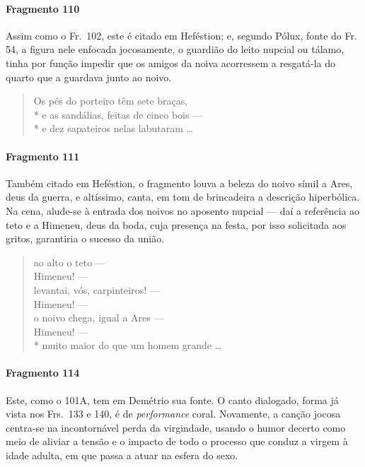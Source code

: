 {\paragraph{Fragmento 110}

{\small Assim como o Fr.~102, este é citado em Heféstion; e, segundo Pólux, fonte do Fr.
54, a figura nele enfocada jocosamente, o guardião do leito nupcial ou tálamo,
tinha por função impedir que os amigos da noiva acorressem a resgatá-la do
quarto que a guardava junto ao noivo.}

\begin{verse}
Os pés do porteiro têm sete braças,\\*
e as sandálias, feitas de cinco bois --- \\*
e dez sapateiros nelas labutaram \ldots{}
\end{verse}

\paragraph{Fragmento 111}

{\small Também citado em Heféstion, o fragmento louva a beleza do noivo símil a Ares,
deus da guerra, e altíssimo, canta, em tom de brincadeira a descrição
hiperbólica. Na cena, alude-se à entrada dos noivos no aposento nupcial --- daí a
referência ao teto e a Himeneu, deus da boda, cuja presença na festa, por isso
solicitada aos gritos, garantiria o sucesso da união.}

\begin{verse}
ao alto o teto --- \\
Himeneu! --- \\
levantai, vós, carpinteiros! --- \\
Himeneu! --- \\
o noivo chega, igual a Ares --- \\
Himeneu! --- \\*
muito maior do que um homem grande \ldots{}
\end{verse}

\paragraph{Fragmento 114}

{\small Este, como o 101A, tem em Demétrio sua fonte. O canto dialogado, forma já vista
nos Frs.~133 e 140, é de \textit{performance} coral. Novamente, a canção jocosa
centra-se na incontornável perda da virgindade, usando o humor decerto como
meio de aliviar a tensão e o impacto de todo o processo que conduz a virgem à
idade adulta, em que passa a atuar na esfera do sexo.}

}
